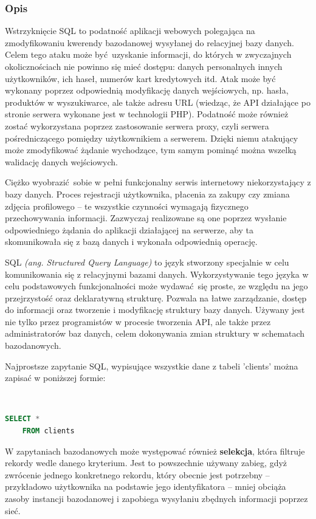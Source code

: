\documentclass[12pt,twoside]{article}
\begin{document}
\subsubsection{Opis}

Wstrzyknięcie SQL to podatność aplikacji webowych polegająca na zmodyfikowaniu kwerendy bazodanowej wysyłanej do relacyjnej bazy danych. Celem tego ataku może być uzyskanie informacji, do których w zwyczajnych okolicznościach nie powinno się mieć dostępu: danych personalnych innych użytkowników, ich haseł, numerów kart kredytowych itd. Atak może być wykonany poprzez odpowiednią modyfikację danych wejściowych, np. hasła, produktów w wyszukiwarce, ale także adresu URL (wiedząc, że API działające po stronie serwera wykonane jest w technologii PHP). Podatność może również zostać wykorzystana poprzez zastosowanie serwera proxy, czyli serwera pośredniczącego pomiędzy użytkownikiem a serwerem. Dzięki niemu atakujący może zmodyfikować żądanie wychodzące, tym samym pominąć można wszelką walidację danych wejściowych. 

Ciężko wyobrazić sobie w pełni funkcjonalny serwis internetowy niekorzystający z bazy danych. Proces rejestracji użytkownika, płacenia za zakupy czy zmiana zdjęcia profilowego -- te wszystkie czynności wymagają fizycznego przechowywania informacji. Zazwyczaj realizowane są one poprzez wysłanie odpowiedniego żądania do aplikacji działającej na serwerze, aby ta skomunikowała się z bazą danych i wykonała odpowiednią operację. 

SQL \emph{(ang. Structured Query Language)} to język stworzony specjalnie w celu komunikowania się z relacyjnymi bazami danych. Wykorzystywanie tego języka w celu podstawowych funkcjonalności może wydawać się proste, ze względu na jego przejrzystość oraz deklaratywną strukturę. Pozwala na łatwe zarządzanie, dostęp do informacji oraz tworzenie i modyfikację struktury bazy danych. Używany jest nie tylko przez programistów w procesie tworzenia API, ale także przez administratorów baz danych, celem dokonywania zmian struktury w schematach bazodanowych.

Najprostsze zapytanie SQL, wypisujące wszystkie dane z tabeli 'clients' można zapisać w poniższej formie:

\

\begin{lstlisting}[language=SQL,caption=Zwrócenie zawartości tabeli 'clients',label={KodSQL1}]
	SELECT * 
	FROM clients
\end{lstlisting}

W zapytaniach bazodanowych może występować również \textbf{selekcja}, która filtruje rekordy wedle danego kryterium. Jest to powszechnie używany zabieg, gdyż zwrócenie jednego konkretnego rekordu, który obecnie jest potrzebny -- przykładowo użytkownika na podstawie jego identyfikatora -- mniej obciąża zasoby instancji bazodanowej i zapobiega wysyłaniu zbędnych informacji poprzez sieć.
\end{document}
